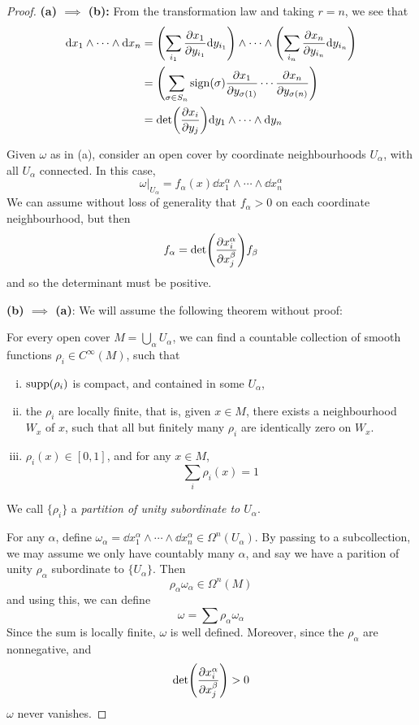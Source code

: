\documentclass{article}
\begin{document}
\begin{proof}
    \textbf{(a) \(\implies\) (b):} From the transformation law and taking \(r = n\), we see that
    \begin{align*}
        \dd x_1 \wedge \cdots \wedge \dd x_n &=\left(\sum_{i_1}\pdv{x_1}{y_{i_1}}\dd y_{i_1}\right) \wedge \cdots \wedge \left(\sum_{i_n}\pdv{x_n}{y_{i_n}}\dd y_{i_n}\right) \\
        &= \left(\sum_{\sigma \in S_n}\operatorname{sign}(\sigma)\pdv{x_1}{y_{\sigma(1)}}\cdots \pdv{x_n}{y_{\sigma(n)}}\right) \\
        &= \det(\pdv{x_i}{y_j})\dd y_1 \wedge \cdots \wedge \dd y_n
    \end{align*}
    
    Given \(\omega\) as in (a), consider an open cover by coordinate neighbourhoods \(U_\alpha\), with all \(U_\alpha\) connected. In this case,
    \[\omega\vert_{U_\alpha} = f_\alpha(x) \dd x^\alpha_1 \wedge \cdots \wedge \dd x^\alpha_n\]
    We can assume without loss of generality that \(f_\alpha > 0\) on each coordinate neighbourhood, but then
    \[f_\alpha = \det(\pdv{x^\alpha_i}{x^\beta_j})f_\beta\]
    and so the determinant must be positive.

    \textbf{(b) \(\implies\) (a)}: We will assume the following theorem without proof:
    \begin{theorem}
        For every open cover \(M = \bigcup_\alpha U_\alpha\), we can find a countable collection of smooth functions \(\rho_i \in C^\infty(M)\), such that
        \begin{enumerate}[(i)]
            \item \(\operatorname{supp}(\rho_i)\) is compact, and contained in some \(U_\alpha\),
            \item the \(\rho_i\) are locally finite, that is, given \(x \in M\), there exists a neighbourhood \(W_x\) of \(x\), such that all but finitely many \(\rho_i\) are identically zero on \(W_x\).
            \item \(\rho_i(x) \in [0, 1]\), and for any \(x \in M\),
            \[\sum_i \rho_i(x) = 1\]
        \end{enumerate}
        We call \(\{\rho_i\}\) a \emph{partition of unity subordinate to \(U_\alpha\)}.
    \end{theorem}

    For any \(\alpha\), define \(\omega_\alpha = \dd x^\alpha_1 \wedge \cdots \wedge \dd x^\alpha_n \in \Omega^n(U_\alpha)\). By passing to a subcollection, we may assume we only have countably many \(\alpha\), and say we have a parition of unity \(\rho_\alpha\) subordinate to \(\{U_\alpha\}\). Then
    \[\rho_\alpha\omega_\alpha \in \Omega^n(M)\]
    and using this, we can define
    \[\omega = \sum \rho_\alpha \omega_\alpha\]
    Since the sum is locally finite, \(\omega\) is well defined. Moreover, since the \(\rho_\alpha\) are nonnegative, and
    \[\det(\pdv{x_i^\alpha}{x_j^\beta}) > 0\]
    \(\omega\) never vanishes.


\end{proof}
\end{document}
